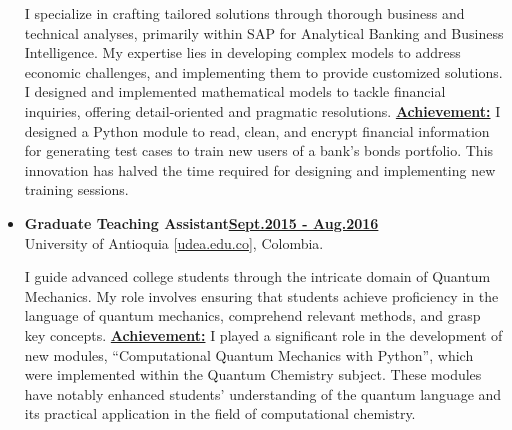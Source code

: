 \begin{itemize}[leftmargin=5mm]
              {\noindent
                  I specialize in crafting tailored solutions through thorough business and technical analyses, primarily within SAP for Analytical Banking and Business Intelligence. My expertise lies in developing complex models to address economic challenges, and implementing them to provide customized solutions. I designed and implemented mathematical models to tackle financial inquiries, offering detail-oriented and pragmatic resolutions.
                  \textbf{\href{.}{Achievement:}} I designed a Python module to read, clean, and encrypt financial information for generating test cases to train new users of a bank's bonds portfolio. This innovation has halved the time required for designing and implementing new training sessions.

              }

    \item \textbf{\large Graduate Teaching Assistant}\hfill \href{.}{\bf Sept.2015 - Aug.2016}\\
          University of Antioquia [\href{www.udea.edu.co}{udea.edu.co}],
          Colombia.

              {\noindent
                  I guide advanced college students through the intricate domain of Quantum Mechanics. My role involves ensuring that students achieve proficiency in the language of quantum mechanics, comprehend relevant methods, and grasp key concepts.
                  \textbf{\href{.}{Achievement:}} I played a significant role in the development of new modules, ``Computational Quantum Mechanics with Python'', which were implemented within the Quantum Chemistry subject. These modules have notably enhanced students' understanding of the quantum language and its practical application in the field of computational chemistry.
              }

\end{itemize}
